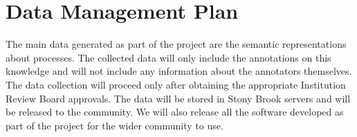 \documentclass[a4paper,11pt,onecolumn]{article}
\begin{document}
\section*{Data Management Plan}

The main data generated as part of the project are the semantic representations about processes. The collected data will only include the annotations on this knowledge and will not include any information about the annotators themselves. The data collection will proceed only after obtaining the appropriate Institution Review Board approvals. The data will be stored in Stony Brook servers and will be released to the community. We will also release all the software developed as part of the project for the wider community to use. 
\end{document}
